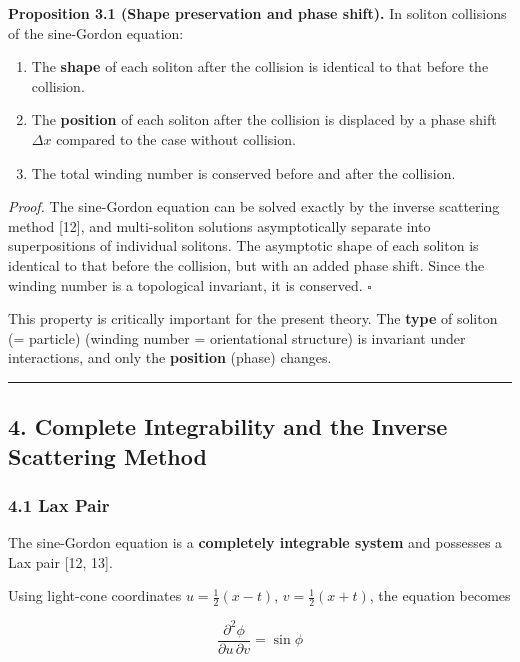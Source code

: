 \documentclass[a4paper,11pt]{article}
\providecommand{\tightlist}{\setlength{\itemsep}{0pt}\setlength{\parskip}{0pt}}
\begin{document}
\textbf{Proposition 3.1 (Shape preservation and phase shift).} In
soliton collisions of the sine-Gordon equation:

\begin{enumerate}
\def\labelenumi{\arabic{enumi}.}
\tightlist
\item
  The \textbf{shape} of each soliton after the collision is identical to
  that before the collision.
\item
  The \textbf{position} of each soliton after the collision is displaced
  by a phase shift \(\Delta x\) compared to the case without collision.
\item
  The total winding number is conserved before and after the collision.
\end{enumerate}

\emph{Proof.} The sine-Gordon equation can be solved exactly by the
inverse scattering method {[}12{]}, and multi-soliton solutions
asymptotically separate into superpositions of individual solitons. The
asymptotic shape of each soliton is identical to that before the
collision, but with an added phase shift. Since the winding number is a
topological invariant, it is conserved. \(\square\)

This property is critically important for the present theory. The
\textbf{type} of soliton (= particle) (winding number = orientational
structure) is invariant under interactions, and only the
\textbf{position} (phase) changes.

\begin{center}\rule{0.5\linewidth}{0.5pt}\end{center}

\subsection{4. Complete Integrability and the Inverse Scattering
Method}\label{complete-integrability-and-the-inverse-scattering-method}

\subsubsection{4.1 Lax Pair}\label{lax-pair}

The sine-Gordon equation is a \textbf{completely integrable system} and
possesses a Lax pair {[}12, 13{]}.

Using light-cone coordinates \(u = \frac{1}{2}(x - t)\),
\(v = \frac{1}{2}(x + t)\), the equation becomes

\[\frac{\partial^2 \phi}{\partial u\,\partial v} = \sin\phi\]
\end{document}
